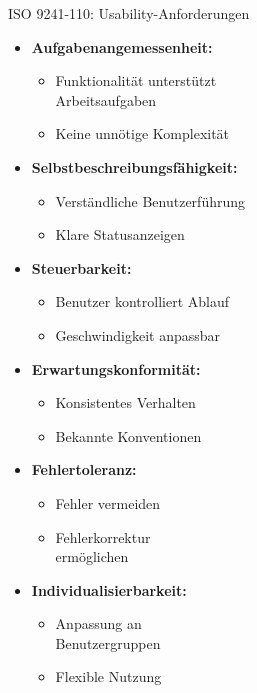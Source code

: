 \begin{theorem}{ISO 9241-110: Usability-Anforderungen}

\begin{minipage}[t]{0.58\linewidth}
\begin{itemize}
    \item \textbf{Aufgabenangemessenheit:}
    \begin{itemize}
        \item Funktionalität unterstützt \\ Arbeitsaufgaben
        \item Keine unnötige Komplexität
    \end{itemize}
    
    \item \textbf{Selbstbeschreibungsfähigkeit:}
    \begin{itemize}
        \item Verständliche Benutzerführung
        \item Klare Statusanzeigen
    \end{itemize}
    
    \item \textbf{Steuerbarkeit:}
    \begin{itemize}
        \item Benutzer kontrolliert Ablauf
        \item Geschwindigkeit anpassbar
    \end{itemize}
    
    \item \textbf{Erwartungskonformität:}
    \begin{itemize}
        \item Konsistentes Verhalten
        \item Bekannte Konventionen
    \end{itemize}
\end{itemize}
\end{minipage}
\begin{minipage}[t]{0.4\linewidth}
\begin{itemize}    
    \item \textbf{Fehlertoleranz:}
    \begin{itemize}
        \item Fehler vermeiden
        \item Fehlerkorrektur \\ ermöglichen
    \end{itemize}
    
    \item \textbf{Individualisierbarkeit:}
    \begin{itemize}
        \item Anpassung an \\ Benutzergruppen
        \item Flexible Nutzung
    \end{itemize}
    

\end{itemize}
\end{minipage}
\end{theorem}
